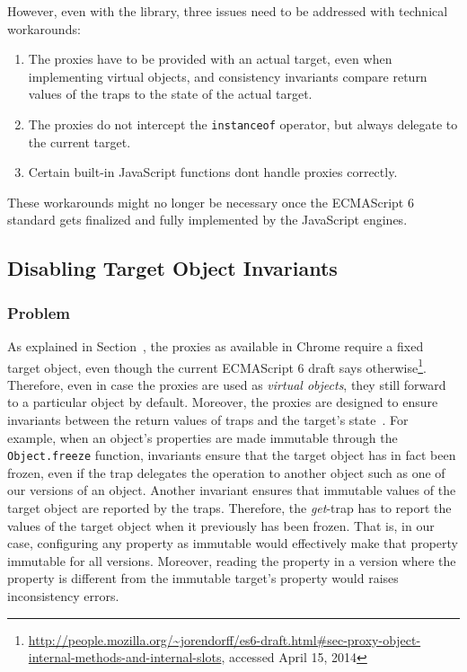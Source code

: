 However, even with the library, three issues need to be addressed with technical workarounds:

\begin{enumerate}
    \item The proxies have to be provided with an actual target, even when implementing virtual objects, and consistency invariants compare return values of the traps to the state of the actual target. 
    \item The proxies do not intercept the \lstinline{instanceof} operator, but always delegate to the current target.
    \item Certain built-in JavaScript functions dont handle proxies correctly.
\end{enumerate}

These workarounds might no longer be necessary once the ECMAScript 6 standard gets finalized and fully implemented by the JavaScript engines. 


\subsection{Disabling Target Object Invariants}

\subsubsection{Problem}
As explained in Section~\label{subsec:IMPLEMENTATION:1.1}, the proxies as available in Chrome require a fixed target object, even though the current ECMAScript 6 draft says otherwise\footnote{\url{http://people.mozilla.org/~jorendorff/es6-draft.html\#sec-proxy-object-internal-methods-and-internal-slots}, accessed April 15, 2014}.
Therefore, even in case the proxies are used as \emph{virtual objects}, they still forward to a particular object by default.
Moreover, the proxies are designed to ensure invariants between the return values of traps and the target's state~\cite{Cutsem2013TRP}.
For example, when an object's properties are made immutable through the \lstinline{Object.freeze} function, invariants ensure that the target object has in fact been frozen, even if the trap delegates the operation to another object such as one of our versions of an object.
Another invariant ensures that immutable values of the target object are reported by the traps.
Therefore, the \emph{get}-trap has to report the values of the target object when it previously has been frozen.
That is, in our case, configuring any property as immutable would effectively make that property immutable for all versions.
Moreover, reading the property in a version where the property is different from the immutable target's property would raises inconsistency errors.


